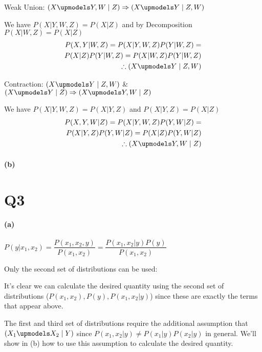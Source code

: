\documentclass[11pt,a4paper]{article}
\begin{document}
Weak Union: $(X \upmodels Y,W \mid Z) \Rightarrow (X \upmodels Y \mid Z,W)$

We have $P(X|Y,W,Z) = P(X|Z)$ and by Decomposition $P(X|W,Z) = P(X|Z)$
\begin{equation*}
	\begin{aligned}
	P(X,Y|W,Z) = P(X|Y,W,Z)P(Y|W,Z) = \\ P(X|Z)P(Y|W,Z) = P(X|W,Z)P(Y|W,Z) \\
	\therefore (X \upmodels Y \mid Z,W)
	\end{aligned}
\end{equation*}

Contraction: $(X \upmodels Y \mid Z,W)$ \& $(X \upmodels Y \mid Z) \Rightarrow (X \upmodels Y,W \mid Z)$

We have $P(X|Y,W,Z) = P(X|Y,Z)$ and $P(X|Y,Z) = P(X|Z)$
\begin{equation*}
	\begin{aligned}
	P(X,Y,W|Z) = P(X|Y,W,Z)P(Y,W|Z) = \\ P(X|Y,Z)P(Y,W|Z) = P(X|Z)P(Y,W|Z) \\
	\therefore (X \upmodels Y,W \mid Z)
	\end{aligned}
\end{equation*}

\paragraph*{(b)}

\section*{Q3}

\paragraph*{(a)}
$P(y|x_{1},x_{2}) = \dfrac{P(x_{1},x_{2},y)}{P(x_{1},x_{2})} = \dfrac{P(x_{1},x_{2}|y)P(y)}{P(x_{1},x_{2})}$

Only the second set of distributions can be used:


It's clear we can calculate the desired quantity using the second set of distributions ($P(x_{1},x_{2}), P(y), P(x_{1},x_{2}|y)$) since these are exactly the terms that appear above. 

The first and third set of distributions require the additional assumption that $(X_{1} \upmodels X_{2} \mid Y)$ since $P(x_{1},x_{2}|y) \neq P(x_{1}|y)P(x_{2}|y)$ in general. We'll show in (b) how to use this assumption to calculate the desired quantity.
\end{document}
